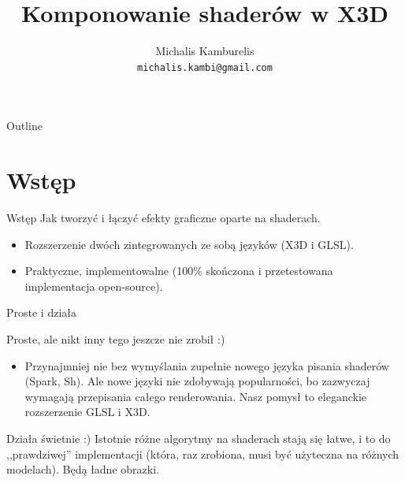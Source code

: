 \documentclass{beamer}
\title{Komponowanie shaderów w X3D}
\author[Michalis Kamburelis]{Michalis Kamburelis \\ \texttt{michalis.kambi@gmail.com}}
\begin{document}
{
  \begin{frame}
    \titlepage
  \end{frame}
}

\begin{frame}{Outline}
  \tableofcontents
\end{frame}

\section{Wstęp}

\begin{frame}{Wstęp}
Jak tworzyć i łączyć efekty graficzne oparte na shaderach.

\begin{itemize}
  \item Rozszerzenie dwóch zintegrowanych ze sobą języków (X3D i GLSL).
  \item Praktyczne, implementowalne (100\% skończona
    i przetestowana implementacja open-source).
\end{itemize}
\end{frame}

\begin{frame}{Proste i działa}

Proste, ale nikt inny tego jeszcze nie zrobił :)

\begin{itemize}
  \item Przynajmniej nie bez wymyślania zupełnie nowego języka pisania shaderów
    (Spark, Sh). Ale nowe języki nie zdobywają popularności,
    bo zazwyczaj wymagają przepisania całego renderowania.
    Nasz pomysł to eleganckie rozszerzenie GLSL i X3D.
\end{itemize}

Działa świetnie :) Istotnie różne algorytmy na shaderach stają się łatwe,
i to do ,,prawdziwej'' implementacji (która, raz zrobiona,
musi być użyteczna na różnych modelach).
Będą ładne obrazki.


\end{frame}
\end{document}
